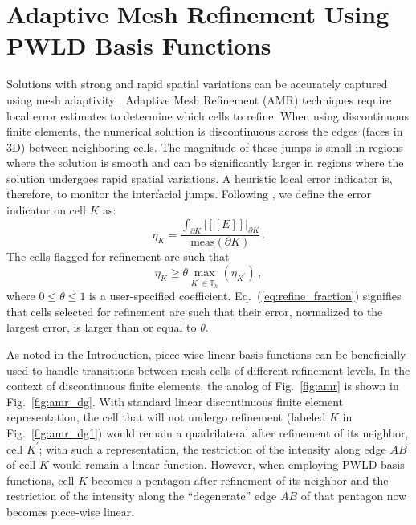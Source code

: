 \documentclass[preprint,10pt]{elsarticle}
\newcommand{\jmp}[1]{[\![#1]\!]}                     %
\newcommand{\eqt}[1]{Eq.~(\ref{#1})}                     %
\newcommand{\fig}[1]{Fig.~\ref{#1}}                      %
\begin{document}
\section{Adaptive Mesh Refinement Using PWLD Basis Functions} \label{sec:amr}

Solutions with strong and rapid spatial variations can be accurately captured using mesh adaptivity
\cite{Ainsworth2000}. Adaptive Mesh Refinement (AMR) techniques require local error estimates to determine
which cells to refine. When using discontinuous finite elements, the numerical solution is discontinuous
across the edges (faces in 3D) between neighboring cells. The magnitude of these jumps is 
small in regions where the solution is smooth and can be significantly larger in regions where
the solution undergoes rapid spatial variations. A heuristic local error indicator is, therefore, to
monitor the interfacial jumps. Following \cite{Leicht2008,Ragusa_Wang_JCP_2011}, we define 
the error indicator on cell $K$ as:
\begin{equation} \label{eq:error_indicator}
  \eta_K = \frac{\int_{\partial K} |\jmp{E}|_{\partial K}} {\text{meas}(\partial K)} \, .
\end{equation}  
%
The cells flagged for refinement are such that 
\begin{equation} \label{eq:refine_fraction}
  \eta_K \ge  \theta \max_{K^\prime \in \mathbb{T}_h} \left( \eta_{K^\prime} \right) \, ,
\end{equation}  
where $0 \le \theta \le 1$ is a user-specified coefficient. \eqt{eq:refine_fraction} signifies
that cells selected for refinement are such that their error, normalized to the largest error, 
is larger than or equal to $\theta$.

As noted in the Introduction, piece-wise linear basis functions can be beneficially used to handle transitions
between mesh cells of different refinement levels. In the context of discontinuous finite elements, the
analog of \fig{fig:amr} is shown in \fig{fig:amr_dg}. With standard linear discontinuous finite element representation, 
the cell that will not undergo refinement (labeled $K$ in \fig{fig:amr_dg1}) would remain a quadrilateral 
after refinement of its neighbor, cell $K^\prime$; with such a representation, the restriction of the intensity 
along edge $AB$ of cell $K$ would remain a linear function. However, when employing 
PWLD basis functions, cell $K$ becomes a pentagon after refinement of its neighbor and the 
restriction of the intensity along the ``degenerate'' edge $AB$ of that pentagon now becomes 
piece-wise linear.
\end{document}
